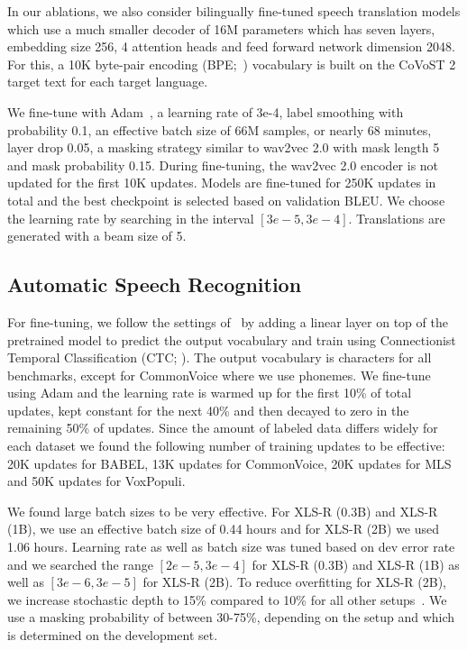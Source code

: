 \documentclass{article} \usepackage{iclr2022_conference,times}
\newcommand{\xlsrp}{XLS-R}
\newcommand{\xlsrpb}[1]{\xlsrp{} {(#1B)}}
\begin{document}
In our ablations, we also consider bilingually fine-tuned speech translation models which use a much smaller decoder of 16M parameters which has seven layers, embedding size 256, 4 attention heads and feed forward network dimension 2048.
For this, a 10K byte-pair encoding (BPE;~\citealt{sennrich2016bpe}) vocabulary is built on the CoVoST 2 target text for each target language. 

We fine-tune with Adam~\citep{kingma2015adam}, a learning rate of 3e-4, label smoothing with probability 0.1, an effective batch size of 66M samples, or nearly 68 minutes, layer drop 0.05, a masking strategy similar to wav2vec 2.0 with mask length 5 and mask probability 0.15.
During fine-tuning, the wav2vec 2.0 encoder is not updated for the first 10K updates. 
Models are fine-tuned for 250K updates in total and the best checkpoint is selected based on validation BLEU. 
We choose the learning rate by searching in the interval $[3e-5, 3e-4]$.
Translations are generated with a beam size of 5.


\subsection{Automatic Speech Recognition}

For fine-tuning, we follow the settings of~\citet{baevski2020wav} by adding a linear layer on top of the pretrained model to predict the output vocabulary and train using Connectionist Temporal Classification (CTC; \citealt{graves2006ctc}).
The output vocabulary is characters for all benchmarks, except for CommonVoice where we use phonemes.
We fine-tune using Adam and the learning rate is warmed up for the first 10\% of total updates, kept constant for the next 40\% and then decayed to zero in the remaining 50\% of updates. 
Since the amount of labeled data differs widely for each dataset we found the following number of training updates to be effective: 20K updates for BABEL, 13K updates for CommonVoice, 20K updates for MLS and 50K updates for VoxPopuli. 

We found large batch sizes to be very effective.
For \xlsrpb{0.3} and \xlsrpb{1}, we use an effective batch size of 0.44 hours and for \xlsrpb{2} we used 1.06 hours. 
Learning rate as well as batch size was tuned based on dev error rate and we searched the range $[2e-5, 3e-4]$ for \xlsrpb{0.3} and \xlsrpb{1} as well as $[3e-6, 3e-5]$ for \xlsrpb{2}.
To reduce overfitting for \xlsrpb{2}, we increase stochastic depth to 15\% compared to 10\% for all other setups~\citep{huang2016stochasticdepth,fan2019layerdrop}. 
We use a masking probability of between 30-75\%, depending on the setup and which is determined on the development set.
\end{document}
